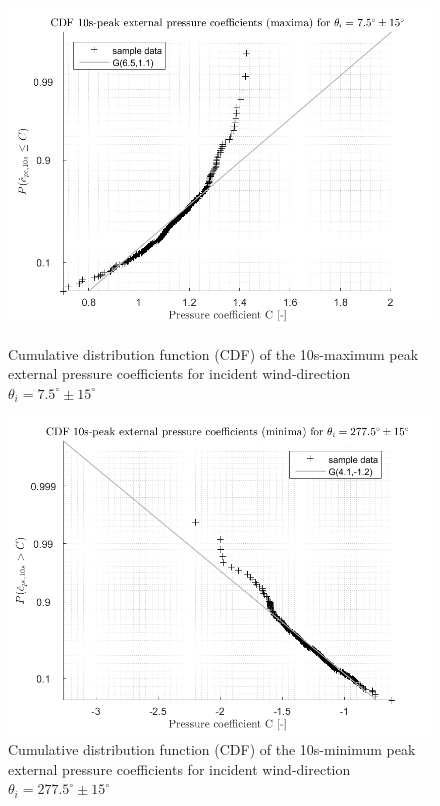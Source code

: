 \begin{figure}[H]
	\begin{minipage}[]{0.5\textwidth}
		\includegraphics[scale=0.4]{images/CDF_10s_peak_external_pressure_coefficients_maxima_G}
		\caption{Cumulative distribution function (CDF) of the 10s-maximum peak external pressure coefficients for incident wind-direction $\theta_i=7.5^{\circ}\pm15^{\circ}$} \label{fig:C_maxima}
	\end{minipage}
	\hspace{0.4cm}
	\begin{minipage}[]{0.5\textwidth}
		\includegraphics[scale=0.4]{images/CDF_10s_peak_external_pressure_coefficients_minima_G}
		\caption{Cumulative distribution function (CDF) of the 10s-minimum peak external pressure coefficients for incident wind-direction $\theta_i=277.5^{\circ}\pm15^{\circ}$} \label{fig:C_minima}
	\end{minipage}
\end{figure}



